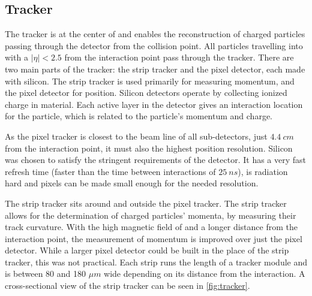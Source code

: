 \subsection{Tracker}

The tracker is at the center of \CMS and enables the reconstruction of charged particles passing through the detector from the collision point.  All particles travelling into \CMS with a \ensuremath{|\eta| < 2.5} from the interaction point pass through the tracker.  There are two main parts of the tracker: the strip tracker and the pixel detector, each made with silicon.  The strip tracker is used primarily for measuring momentum, and the pixel detector for position.
Silicon detectors operate by collecting ionized charge in material.  Each active layer in the detector gives an interaction location for the particle, which is related to the particle's momentum and charge. 

As the pixel tracker is closest to the beam line of all sub-detectors, just \ensuremath{\SI{4.4}{cm}} from the interaction point, it must also the highest position resolution.  Silicon was chosen to satisfy the stringent requirements of the detector. It has a very fast refresh time (faster than the time between interactions of \ensuremath{\SI{25}{ns}}), is radiation hard and pixels can be made small enough for the needed resolution.  



The strip tracker sits around and outside the pixel tracker.  The strip tracker allows for the determination of charged particles' momenta, by measuring their track curvature.  With the high magnetic field of \CMS and a longer distance from the interaction point, the measurement of momentum is improved over just the pixel detector. While a larger pixel detector could be built in the place of the strip tracker, this was not practical.  Each strip runs the length of a tracker module and is between 80 and 180 \ensuremath{\mu m} wide depending on its distance from the interaction. A cross-sectional view of the strip tracker can be seen in \ref{fig:tracker}.

